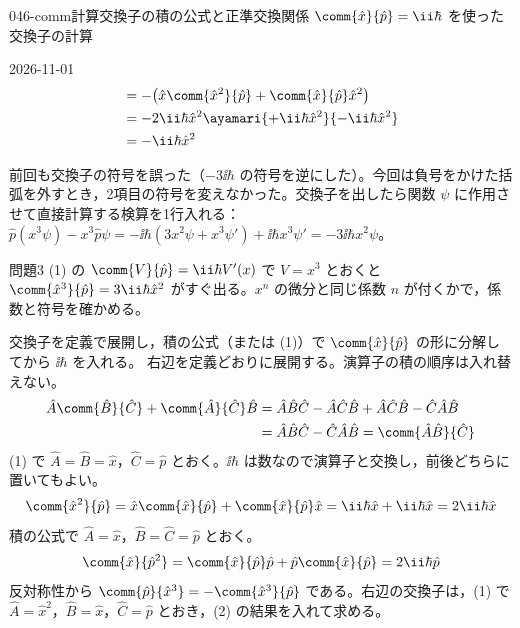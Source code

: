\documentclass[uplatex,dvipdfmx,a4paper,11pt]{jsarticle}
\begin{document}
\begin{mondai}{046-comm}{計算}{交換子の積の公式と正準交換関係 $\comm{\hat{x}}{\hat{p}}=\ii\hbar$ を使った交換子の計算}
\begin{kotaeutsushi}{2026-11-01}
\begin{align*}
&=-\bigl(\hat{x}\comm{\hat{x}^{2}}{\hat{p}}+\comm{\hat{x}}{\hat{p}}\hat{x}^{2}\bigr)\\
&=-2\ii\hbar\hat{x}^{2}\ayamari{+\ii\hbar\hat{x}^{2}}{-\ii\hbar\hat{x}^{2}}\\
&=-\ii\hbar\hat{x}^{2}
\end{align*}
\end{kotaeutsushi}
\begin{kizuki}
\item {} 前回も交換子の符号を誤った（$-3\ii\hbar$ の符号を逆にした）。今回は負号をかけた括弧を外すとき，2項目の符号を変えなかった。交換子を出したら関数 $\psi$ に作用させて直接計算する検算を1行入れる：$\hat{p}(x^{3}\psi)-x^{3}\hat{p}\psi=-\ii\hbar(3x^{2}\psi+x^{3}\psi')+\ii\hbar x^{3}\psi'=-3\ii\hbar x^{2}\psi$。
\item 問題3 (1) の $\comm{V}{\hat{p}}=\ii\hbar V'(x)$ で $V=x^{3}$ とおくと $\comm{\hat{x}^{3}}{\hat{p}}=3\ii\hbar\hat{x}^{2}$ がすぐ出る。$x^{n}$ の微分と同じ係数 $n$ が付くかで，係数と符号を確かめる。
\end{kizuki}
\begin{tadashii}
\houshin 交換子を定義で展開し，積の公式（または (1)）で $\comm{\hat{x}}{\hat{p}}$ の形に分解してから $\ii\hbar$ を入れる。
\keisan {} 右辺を定義どおりに展開する。演算子の積の順序は入れ替えない。
\begin{align*}
\hat{A}\comm{\hat{B}}{\hat{C}}+\comm{\hat{A}}{\hat{C}}\hat{B}
&=\hat{A}\hat{B}\hat{C}-\hat{A}\hat{C}\hat{B}+\hat{A}\hat{C}\hat{B}-\hat{C}\hat{A}\hat{B}\\
&=\hat{A}\hat{B}\hat{C}-\hat{C}\hat{A}\hat{B}=\comm{\hat{A}\hat{B}}{\hat{C}}
\end{align*}
 (1) で $\hat{A}=\hat{B}=\hat{x}$，$\hat{C}=\hat{p}$ とおく。$\ii\hbar$ は数なので演算子と交換し，前後どちらに置いてもよい。
\[ \comm{\hat{x}^{2}}{\hat{p}}=\hat{x}\comm{\hat{x}}{\hat{p}}+\comm{\hat{x}}{\hat{p}}\hat{x}=\ii\hbar\hat{x}+\ii\hbar\hat{x}=2\ii\hbar\hat{x} \]
 積の公式で $\hat{A}=\hat{x}$，$\hat{B}=\hat{C}=\hat{p}$ とおく。
\[ \comm{\hat{x}}{\hat{p}^{2}}=\comm{\hat{x}}{\hat{p}}\hat{p}+\hat{p}\comm{\hat{x}}{\hat{p}}=2\ii\hbar\hat{p} \]
 反対称性から $\comm{\hat{p}}{\hat{x}^{3}}=-\comm{\hat{x}^{3}}{\hat{p}}$ である。右辺の交換子は，(1) で $\hat{A}=\hat{x}^{2}$，$\hat{B}=\hat{x}$，$\hat{C}=\hat{p}$ とおき，(2) の結果を入れて求める。

\end{tadashii}
\end{mondai}
\end{document}
